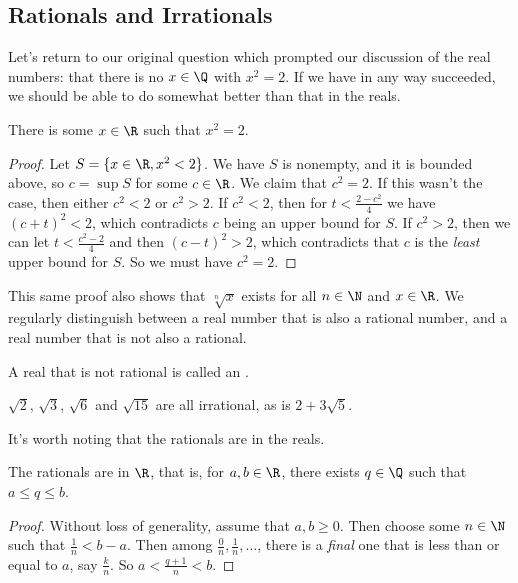 \documentclass[a4paper]{scrreprt}
\begin{document}
\subsection{Rationals and Irrationals}

Let's return to our original question which prompted our discussion of the real numbers: that there is no $x \in \Q$ with $x^2 = 2$. If we have in any way succeeded, we should be able to do somewhat better than that in the reals. 

\begin{proposition}
	There is some $x \in \R$ such that $x^2 = 2$.
\end{proposition}
\begin{proof}
	Let $S = \{x \in \R, x^2 < 2\}$. We have $S$ is nonempty, and it is bounded above, so $c = \sup S$ for some $c \in \R$. We claim that $c^2 = 2$. If this wasn't the case, then either $c^2 < 2$ or $c^2 > 2$. If $c^2 < 2$, then for $t < \frac{2 - c^2}{4}$ we have $(c + t)^2 < 2$, which contradicts $c$ being an upper bound for $S$. If $c^2 > 2$, then we can let $t < \frac{c^2 - 2}{4}$ and then $(c - t)^2 > 2$, which contradicts that $c$ is the \emph{least} upper bound for $S$. So we must have $c^2 = 2$.
\end{proof}

This same proof also shows that $\sqrt[n]{x}$ exists for all $n \in \N$ and $x \in \R$. 
We regularly distinguish between a real number that is also a rational number, and a real number that is not also a rational.

\begin{definition}
	A real that is not rational is called an .
\end{definition}


\begin{example}
	$\sqrt{2}$, $\sqrt{3}$, $\sqrt{6}$ and $\sqrt{15}$ are all irrational, as is $2 + 3\sqrt{5}$.
\end{example}

It's worth noting that the rationals are  in the reals.

\begin{theorem}[$\Q$ is dense in $\R$]
		The rationals are  in $\R$, that is, for $a, b \in \R$, there exists $q \in \Q$ such that $a \leq q \leq b$.
\end{theorem}
\begin{proof}
	Without loss of generality, assume that $a, b \geq 0$. Then choose some $n \in \N$ such that $\frac{1}{n} < b - a$. Then among
	$\frac{0}{n}, \frac{1}{n}, \dots$, there is a \emph{final} one that is less than or equal to $a$, say $\frac{k}{n}$. So $a < \frac{q + 1}{n} < b$.
\end{proof}
\end{document}
